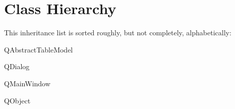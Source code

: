 \section{Class Hierarchy}
This inheritance list is sorted roughly, but not completely, alphabetically\+:\begin{DoxyCompactList}
\item Q\+Abstract\+Table\+Model\begin{DoxyCompactList}
\item {}
\end{DoxyCompactList}
\item Q\+Dialog\begin{DoxyCompactList}
\item {}
\end{DoxyCompactList}
\item Q\+Main\+Window\begin{DoxyCompactList}
\item {}
\end{DoxyCompactList}
\item Q\+Object\begin{DoxyCompactList}
\item {}
\end{DoxyCompactList}
\end{DoxyCompactList}

